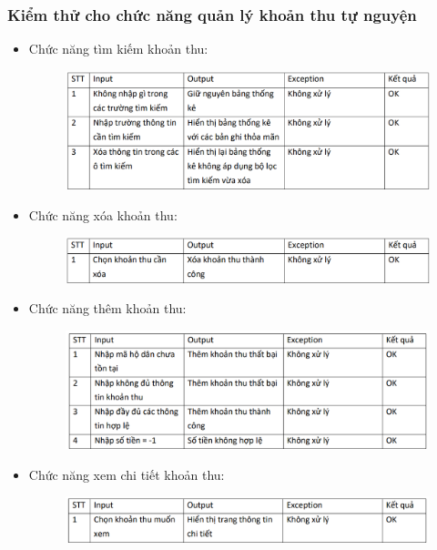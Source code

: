 \documentclass{article}
\begin{document}
\subsubsection{Kiểm thử cho chức năng quản lý khoản thu tự nguyện}
\begin{itemize}
    \item Chức năng tìm kiếm khoản thu:
    \begin{figure}[H]
        \centering
        \includegraphics[width=1\textwidth]{Kiểm thử/Kt tìm kiếm khoản thu.png}
    \end{figure}

    \item Chức năng xóa khoản thu:
    \begin{figure}[H]
        \centering
        \includegraphics[width=1\textwidth]{Kiểm thử/KT xóa khoản thu.png}
    \end{figure}
    \newpage
    \item Chức năng thêm khoản thu:
    \begin{figure}[H]
        \centering
        \includegraphics[width=1\textwidth]{Kiểm thử/KT thêm khoản thu.png}
    \end{figure}
    \item Chức năng xem chi tiết khoản thu:
    \begin{figure}[H]
        \centering
        \includegraphics[width=1\textwidth]{Kiểm thử/KT chi tiết khoản thu.png}
    \end{figure}    
\end{itemize}
\end{document}
